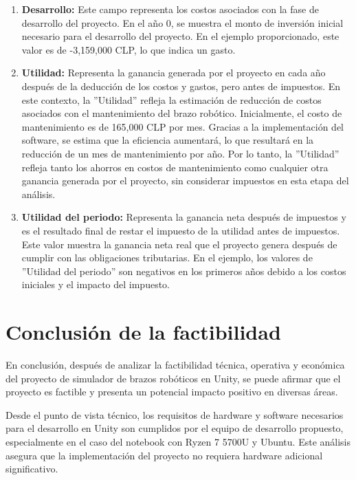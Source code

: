 \begin{enumerate}[label=\arabic*.]
    \item \textbf{Desarrollo:} Este campo representa los costos asociados con la fase de desarrollo del proyecto. En el año 0, se muestra el monto de inversión inicial necesario para el desarrollo del proyecto. En el ejemplo proporcionado, este valor es de -3,159,000 CLP, lo que indica un gasto.
    
    \item \textbf{Utilidad:} Representa la ganancia generada por el proyecto en cada año después de la deducción de los costos y gastos, pero antes de impuestos. En este contexto, la ''Utilidad'' refleja la estimación de reducción de costos asociados con el mantenimiento del brazo robótico. Inicialmente, el costo de mantenimiento es de 165,000 CLP por mes. Gracias a la implementación del software, se estima que la eficiencia aumentará, lo que resultará en la reducción de un mes de mantenimiento por año. Por lo tanto, la ''Utilidad'' refleja tanto los ahorros en costos de mantenimiento como cualquier otra ganancia generada por el proyecto, sin considerar impuestos en esta etapa del análisis.
    
    \item \textbf{Utilidad del periodo:} Representa la ganancia neta después de impuestos y es el resultado final de restar el impuesto de la utilidad antes de impuestos. Este valor muestra la ganancia neta real que el proyecto genera después de cumplir con las obligaciones tributarias. En el ejemplo, los valores de ''Utilidad del periodo'' son negativos en los primeros años debido a los costos iniciales y el impacto del impuesto.
\end{enumerate}

\clearpage
\section{Conclusión de la factibilidad}

En conclusión, después de analizar la factibilidad técnica, operativa y económica del proyecto de simulador de brazos robóticos en Unity, se puede afirmar que el proyecto es factible y presenta un potencial impacto positivo en diversas áreas.

Desde el punto de vista técnico, los requisitos de hardware y software necesarios para el desarrollo en Unity son cumplidos por el equipo de desarrollo propuesto, especialmente en el caso del notebook con Ryzen 7 5700U y Ubuntu. Este análisis asegura que la implementación del proyecto no requiera hardware adicional significativo.

